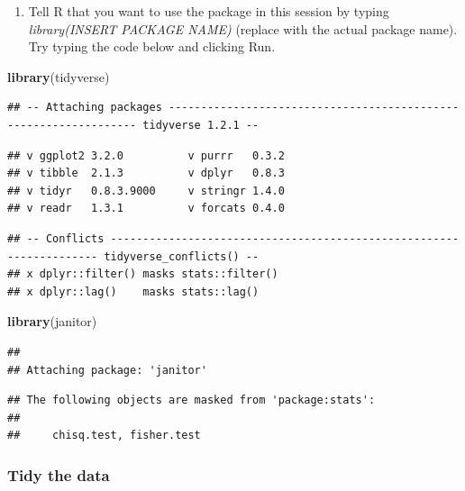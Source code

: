 \documentclass[]{article}
\newenvironment{Shaded}{\begin{snugshade}}{\end{snugshade}}
\newcommand{\KeywordTok}[1]{\textcolor[rgb]{0.13,0.29,0.53}{\textbf{#1}}}
\newcommand{\NormalTok}[1]{#1}
\providecommand{\tightlist}{%
  \setlength{\itemsep}{0pt}\setlength{\parskip}{0pt}}
\begin{document}
\begin{enumerate}
\def\labelenumi{\arabic{enumi})}
\setcounter{enumi}{1}
\tightlist
\item
  Tell R that you want to use the package in this session by typing
  \emph{library(INSERT PACKAGE NAME)} (replace with the actual package
  name). Try typing the code below and clicking Run.
\end{enumerate}

\begin{Shaded}
\begin{Highlighting}[]
\KeywordTok{library}\NormalTok{(tidyverse)}
\end{Highlighting}
\end{Shaded}

\begin{verbatim}
## -- Attaching packages ----------------------------------------------------------------- tidyverse 1.2.1 --
\end{verbatim}

\begin{verbatim}
## v ggplot2 3.2.0          v purrr   0.3.2     
## v tibble  2.1.3          v dplyr   0.8.3     
## v tidyr   0.8.3.9000     v stringr 1.4.0     
## v readr   1.3.1          v forcats 0.4.0
\end{verbatim}

\begin{verbatim}
## -- Conflicts -------------------------------------------------------------------- tidyverse_conflicts() --
## x dplyr::filter() masks stats::filter()
## x dplyr::lag()    masks stats::lag()
\end{verbatim}

\begin{Shaded}
\begin{Highlighting}[]
\KeywordTok{library}\NormalTok{(janitor)}
\end{Highlighting}
\end{Shaded}

\begin{verbatim}
## 
## Attaching package: 'janitor'
\end{verbatim}

\begin{verbatim}
## The following objects are masked from 'package:stats':
## 
##     chisq.test, fisher.test
\end{verbatim}

\subsubsection{Tidy the data}\label{tidy-the-data-1}
\end{document}
